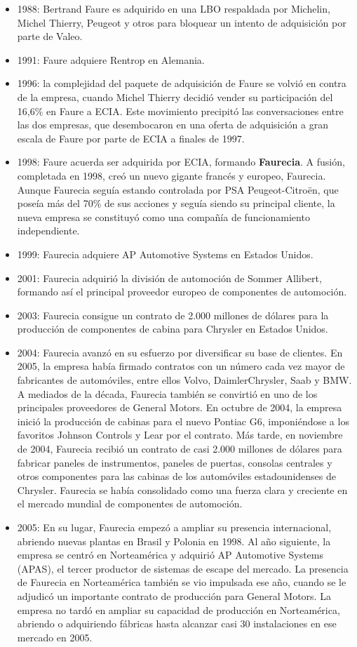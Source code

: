 \documentclass[letterpaper,12pt]{article}
\begin{document}
\begin{sloppypar}
\begin{itemize}
    \item 1988: Bertrand Faure es adquirido en una LBO respaldada por Michelin, Michel Thierry, Peugeot y otros para bloquear un intento de adquisición por parte de Valeo.
    \item 1991: Faure adquiere Rentrop en Alemania.
    \item 1996:  la complejidad del paquete de adquisición de Faure se volvió en contra de la empresa, cuando Michel Thierry decidió vender su participación del 16,6\% en Faure a ECIA. Este movimiento precipitó las conversaciones entre las dos empresas, que desembocaron en una oferta de adquisición a gran escala de Faure por parte de ECIA a finales de 1997. 
    \item 1998: Faure acuerda ser adquirida por ECIA, formando \textbf{Faurecia}. A fusión, completada en 1998, creó un nuevo gigante francés y europeo, Faurecia. Aunque Faurecia seguía estando controlada por PSA Peugeot-Citroën, que poseía más del 70\% de sus acciones y seguía siendo su principal cliente, la nueva empresa se constituyó como una compañía de funcionamiento independiente.
    \item 1999: Faurecia adquiere AP Automotive Systems en Estados Unidos.
    \item 2001: Faurecia adquirió la división de automoción de Sommer Allibert, formando así el principal proveedor europeo de componentes de automoción.
    \item 2003: Faurecia consigue un contrato de 2.000 millones de dólares para la producción de componentes de cabina para Chrysler en Estados Unidos.
    \item 2004: Faurecia avanzó en su esfuerzo por diversificar su base de clientes. En 2005, la empresa había firmado contratos con un número cada vez mayor de fabricantes de automóviles, entre ellos Volvo, DaimlerChrysler, Saab y BMW. A mediados de la década, Faurecia también se convirtió en uno de los principales proveedores de General Motors. En octubre de 2004, la empresa inició la producción de cabinas para el nuevo Pontiac G6, imponiéndose a los favoritos Johnson Controls y Lear por el contrato. Más tarde, en noviembre de 2004, Faurecia recibió un contrato de casi 2.000 millones de dólares para fabricar paneles de instrumentos, paneles de puertas, consolas centrales y otros componentes para las cabinas de los automóviles estadounidenses de Chrysler. Faurecia se había consolidado como una fuerza clara y creciente en el mercado mundial de componentes de automoción.
    \item 2005: En su lugar, Faurecia empezó a ampliar su presencia internacional, abriendo nuevas plantas en Brasil y Polonia en 1998. Al año siguiente, la empresa se centró en Norteamérica y adquirió AP Automotive Systems (APAS), el tercer productor de sistemas de escape del mercado. La presencia de Faurecia en Norteamérica también se vio impulsada ese año, cuando se le adjudicó un importante contrato de producción para General Motors. La empresa no tardó en ampliar su capacidad de producción en Norteamérica, abriendo o adquiriendo fábricas hasta alcanzar casi 30 instalaciones en ese mercado en 2005.

\end{itemize}
\end{sloppypar}
\end{document}
